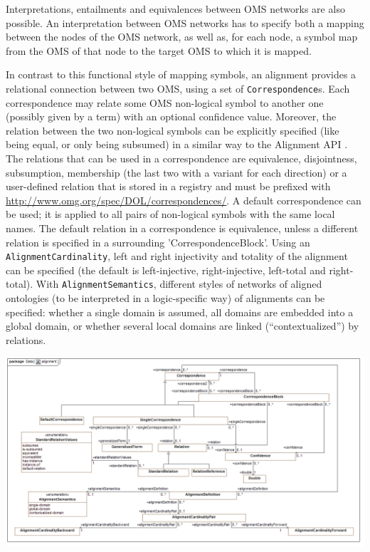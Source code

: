 \documentclass[10pt,fleqn,final]{scrreprt}
\newcommand*{\termref}[1]{\index{#1}#1\xspace}
\newcommand*{\syntax}[1]{\texttt{#1}}
\newenvironment{definitions}[0]{\medskip }{}
\begin{document}
\begin{definitions}
Interpretations, entailments and equivalences between OMS networks are also possible. An 
interpretation between OMS networks has to specify both a mapping between the nodes of the OMS 
network, as well as, for each node, a symbol map from the OMS of that node to the target OMS to 
which it is mapped.


In contrast to this functional style of mapping symbols, an alignment provides a relational 
connection between two OMS,  using a set of \syntax{Correspondence}s. Each correspondence may relate 
some OMS non-logical symbol to another one (possibly given by a term) with an optional confidence 
value. Moreover, the relation between the two non-logical symbols can be explicitly
specified (like being equal, or only being subsumed) in a similar way to the Alignment API \cite{AlignmentAPI}. 
The relations that can be used in a correspondence are equivalence, disjointness, subsumption, membership (the last two with a
variant for each direction) or a user-defined relation that is stored in a registry and must be prefixed with
\url{http://www.omg.org/spec/DOL/correspondences/}.
A default correspondence can be used; it is applied to all pairs of non-logical symbols with 
the same local names. The default relation in a correspondence is equivalence, unless  a different 
relation is specified in a surrounding 
'CorrespondenceBlock'.
Using an \syntax{AlignmentCardinality}, left and right injectivity and totality of the
\termref{alignment} can be specified (the default is left-injective, right-injective, left-total  and right-total).
With \syntax{AlignmentSemantics}, different styles of networks of aligned ontologies (to be interpreted in 
a logic-specific way) of alignments can be specified: whether a single domain is assumed, all domains are embedded into a global domain,
or whether several local domains are linked (``contextualized'') by relations.

\includegraphics[width=\textwidth]{mof/Class_Diagram__alignment.png}


\end{definitions}
\end{document}
